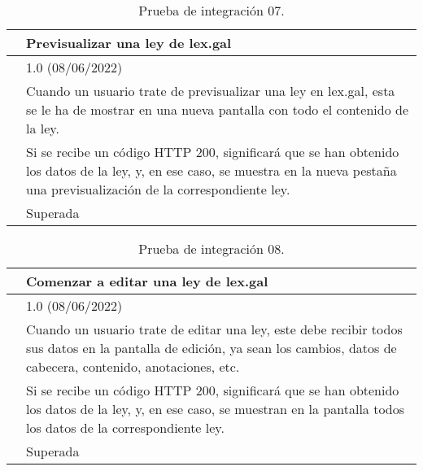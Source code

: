\begin{table}[H]
\begin{center}
\begin{tabular}{|p{3cm}|p{10cm}|} \hline
\centering {\bf PI-07} & Previsualizar una ley de lex.gal  \\ \hline\hline
\centering {\bf Versión} & 1.0 (08/06/2022) \\ \hline
\centering {\bf Descripción} & Cuando un usuario trate de previsualizar una ley en lex.gal, esta se le ha de mostrar en una nueva pantalla con todo el contenido de la ley. \\ \hline
\centering {\bf Criterio de aceptación} & Si se recibe un código HTTP 200, significará que se han obtenido los datos de la ley, y, en ese caso, se muestra en la nueva pestaña una previsualización de la correspondiente ley. \\ \hline
\centering {\bf Estado} & Superada \\ \hline
\end{tabular}
\caption{Prueba de integración 07.}
\label{enlacePI7}
\end{center}
\end{table}

\begin{table}[H]
\begin{center}
\begin{tabular}{|p{3cm}|p{10cm}|} \hline
\centering {\bf PI-08} & Comenzar a editar una ley de lex.gal  \\ \hline\hline
\centering {\bf Versión} & 1.0 (08/06/2022) \\ \hline
\centering {\bf Descripción} & Cuando un usuario trate de editar una ley, este debe recibir todos sus datos en la pantalla de edición, ya sean los cambios, datos de cabecera, contenido, anotaciones, etc. \\ \hline
\centering {\bf Criterio de aceptación} & Si se recibe un código HTTP 200, significará que se han obtenido los datos de la ley, y, en ese caso, se muestran en la pantalla todos los datos de la correspondiente ley. \\ \hline
\centering {\bf Estado} & Superada \\ \hline
\end{tabular}
\caption{Prueba de integración 08.}
\label{enlacePI8}
\end{center}
\end{table}

